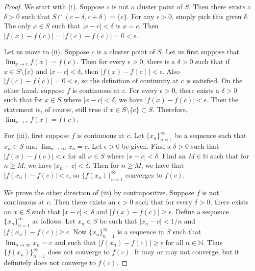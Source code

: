\documentclass{article}
\theoremstyle{definition}
\begin{document}
\begin{proof}
    We start with (i). Suppose \( c \) is not a cluster point of \( S \). Then there exists a \( \delta > 0 \) such that \( S \cap (c - \delta, c + \delta) = \{c\} \). For any \( \epsilon > 0 \), simply pick this given \( \delta \). The only \( x \in S \) such that \( |x - c| < \delta \) is \( x = c \). Then \( |f(x) - f(c)| = |f(c) - f(c)| = 0 < \epsilon \).

Let us move to (ii). Suppose \( c \) is a cluster point of \( S \). Let us first suppose that \( \lim_{x \to c} f(x) = f(c) \). Then for every \( \epsilon > 0 \), there is a \( \delta > 0 \) such that if \( x \in S \setminus \{c\} \) and \( |x - c| < \delta \), then \( |f(x) - f(c)| < \epsilon \). Also \( |f(c) - f(c)| = 0 < \epsilon \), so the definition of continuity at \( c \) is satisfied. On the other hand, suppose \( f \) is continuous at \( c \). For every \( \epsilon > 0 \), there exists a \( \delta > 0 \) such that for \( x \in S \) where \( |x - c| < \delta \), we have \( |f(x) - f(c)| < \epsilon \). Then the statement is, of course, still true if \( x \in S \setminus \{c\} \subset S \). Therefore, \( \lim_{x \to c} f(x) = f(c) \).

For (iii), first suppose \( f \) is continuous at \( c \). Let \( \{x_n\}_{n=1}^{\infty} \) be a sequence such that \( x_n \in S \) and \( \lim_{n \to \infty} x_n = c \). Let \( \epsilon > 0 \) be given. Find a \( \delta > 0 \) such that \( |f(x) - f(c)| < \epsilon \) for all \( x \in S \) where \( |x - c| < \delta \). Find an \( M \in \mathbb{N} \) such that for \( n \geq M \), we have \( |x_n - c| < \delta \). Then for \( n \geq M \), we have that \( |f(x_n) - f(c)| < \epsilon \), so \( \{f(x_n)\}_{n=1}^{\infty} \) converges to \( f(c) \).

We prove the other direction of (iii) by contrapositive. Suppose \( f \) is not continuous at \( c \). Then there exists an \( \epsilon > 0 \) such that for every \( \delta > 0 \), there exists an \( x \in S \) such that \( |x - c| < \delta \) and \( |f(x) - f(c)| \geq \epsilon \). Define a sequence \( \{x_n\}_{n=1}^{\infty} \) as follows. Let \( x_n \in S \) be such that \( |x_n - c| < 1/n \) and \( |f(x_n) - f(c)| \geq \epsilon \). Now \( \{x_n\}_{n=1}^{\infty} \) is a sequence in \( S \) such that \( \lim_{n \to \infty} x_n = c \) and such that \( |f(x_n) - f(c)| \geq \epsilon \) for all \( n \in \mathbb{N} \). Thus \( \{f(x_n)\}_{n=1}^{\infty} \) does not converge to \( f(c) \). It may or may not converge, but it definitely does not converge to \( f(c) \).
\end{proof}
\end{document}
